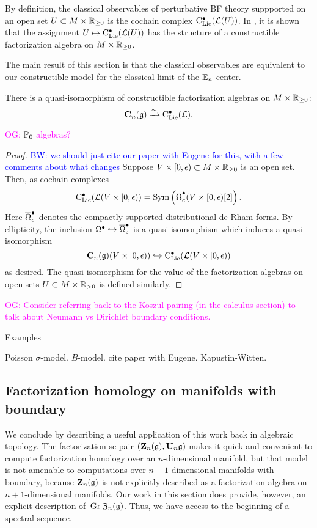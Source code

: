 \documentclass[11pt]{amsart}
\numberwithin{equation}{section}
\def\brian{\textcolor{blue}{BW: }\textcolor{blue}}
\def\owen{\textcolor{magenta}{OG: }\textcolor{magenta}}
\begin{document}
By definition, the classical observables of perturbative BF theory suppported on an open set $U \subset M \times \mathbb R_{\geq 0}$ is the cochain complex ${\rm C}_{\rm Lie}^\bullet (\mathcal L (U))$. 
In \cite{Eugene}, it is shown that the assignment $U \mapsto {\rm C}_{\rm Lie}^\bullet (\mathcal L(U))$ has the structure of a constructible factorization algebra on $M \times \mathbb R_{\geq 0}$. 

The main result of this section is that the classical observables are equivalent to our constructible model for the classical limit of the $\mathbb E_n$ center. 

\begin{prp}
There is a quasi-isomorphism of constructible factorization algebras on $M \times \mathbb R_{\geq 0}$:
\[
\mathbf C_n (\mathfrak g) \xrightarrow{\simeq} {\rm C}_{\rm Lie}^\bullet(\mathcal L) .
\]
\end{prp}

\owen{$\mathbb P_0$ algebras?}

\begin{proof}
\brian{we should just cite our paper with Eugene for this, with a few comments about what changes}
Suppose $V \times [0,\epsilon) \subset M \times \mathbb R_{\geq 0}$ is an open set. 
Then, as cochain complexes 
\[
{\rm C}_{{\rm Lie}}^\bullet(\mathcal L(V \times [0,\epsilon)) = {\rm Sym} \left(\overline{\Omega}^\bullet_c(V \times [0,\epsilon) [2] \right)  .
\]
Here $\overline{\Omega}^\bullet_c$ denotes the compactly supported distributional de Rham forms. 
By ellipticity, the inclusion $\Omega^\bullet \hookrightarrow \overline{\Omega}^\bullet_c$ is a quasi-isomorphism which induces a quasi-isomorphism
\[
\mathbf C_n(\mathfrak g) (V \times [0,\epsilon)) \hookrightarrow {\rm C}_{{\rm Lie}}^\bullet(\mathcal L(V \times [0,\epsilon)) 
\]
as desired. 
The quasi-isomorphism for the value of the factorization algebras on open sets $U \subset M \times \mathbb R_{>0}$ is defined similarly. 
\end{proof}

\owen{Consider referring back to the Koszul pairing (in the calculus section) to talk about Neumann vs Dirichlet boundary conditions.}


\begin{rmk} Examples

Poisson $\sigma$-model. 
$B$-model. 
cite paper with Eugene.
Kapustin-Witten. 
\end{rmk}

\subsection{Factorization homology on manifolds with boundary}

We conclude by describing a useful application of this work back in algebraic topology.
The factorization sc-pair $(\mathbf Z_n(\mathfrak g), \mathbf U_n \mathfrak g)$ makes it quick and convenient to compute factorization homology over an $n$-dimensional manifold,
but that model is not amenable to computations over $n+1$-dimensional manifolds with boundary,
because $\mathbf Z_n(\mathfrak g)$ is not explicitly described as a factorization algebra on $n+1$-dimensional manifolds.
Our work in this section does provide, however, an explicit description of~${\rm Gr}\; {\frak Z}_n(\mathfrak g)$. 
Thus, we have access to the beginning of a spectral sequence.
\end{document}
